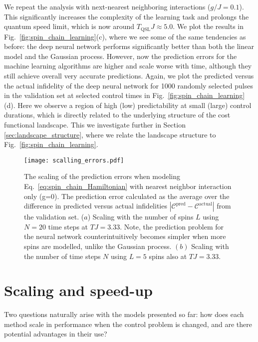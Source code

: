 \documentclass[aps, twocolumn,superscriptaddress]{revtex4-1}
\begin{document}
We repeat the analysis with next-nearest neighboring interactions ($g/J=0.1$). This significantly increases the complexity of the learning task and prolongs the quantum speed limit, which is now around $T_{\text{QSL}}J \approx 5.0$. We plot the results in Fig.~\ref{fig:spin_chain_learning}(c), where we see some of the same tendencies as before: the deep neural network performs significantly better than both the linear model and the Gaussian process. However, now the prediction errors for the machine learning algorithms are higher and scale worse with time, although they still achieve overall very accurate predictions. Again, we plot the predicted versus the actual infidelity of the deep neural network for 1000 randomly selected pulses in the validation set at selected control times in Fig.~\ref{fig:spin_chain_learning}(d). Here we observe a region of high (low) predictability at small (large) control durations, which is directly related to the underlying structure of the cost functional landscape. This we investigate further in Section \ref{sec:landscape_structure}, where we relate the landscape structure to Fig.~\ref{fig:spin_chain_learning}.    

\begin{figure*}
    \centering
    \texttt{[image: scalling\_errors.pdf]}
    \caption{The scaling of the prediction errors when modeling Eq.~\ref{eq:spin_chain_Hamiltonian} with nearest neighbor interaction only (g=0). The prediction error calculated as the average over the difference in predicted versus actual infidelities $|\mathcal{C}^{\text{pred}}-\mathcal{C}^{\text{actual}}|$ from the validation set. ($a$) Scaling with the number of spins $L$ using $N = 20$ time steps at $TJ = 3.33$. Note, the prediction problem for the neural network counterintuitively becomes simpler when more spins are modelled, unlike the Gaussian process. $(b)$ Scaling with the number of time steps $N$ using $L=5$ spins also at $TJ = 3.33$. 
    }
    \label{fig:scaling_errors}
\end{figure*}



\section{Scaling and speed-up} \label{sec:scalling_speed}


Two questions naturally arise with the models presented so far: how does each method scale in performance when the control problem is changed, and are there potential advantages in their use?
\end{document}
